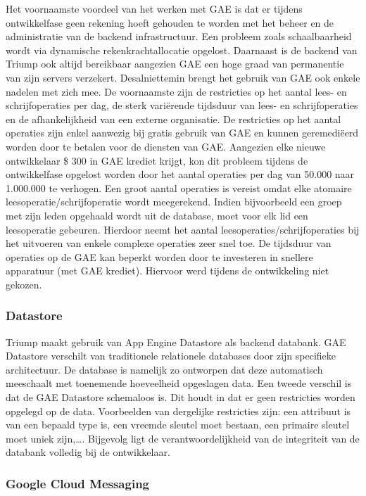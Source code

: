 Het voornaamste voordeel van het werken met GAE is dat er tijdens ontwikkelfase geen rekening hoeft gehouden te worden met het  beheer en de administratie van de backend infrastructuur. Een probleem zoals schaalbaarheid wordt via dynamische rekenkrachtallocatie opgelost. Daarnaast is de backend van Triump ook altijd bereikbaar aangezien GAE een hoge graad van permanentie van zijn servers verzekert. Desalniettemin brengt het gebruik van GAE ook enkele nadelen met zich mee. De voornaamste zijn de restricties op het aantal lees- en schrijfoperaties per dag, de sterk variërende tijdsduur van lees- en schrijfoperaties en de afhankelijkheid van een externe organisatie. De restricties op het aantal operaties zijn enkel aanwezig bij gratis gebruik van GAE en kunnen geremediëerd worden door te betalen voor de diensten van GAE.
Aangezien elke nieuwe ontwikkelaar \$ 300 in GAE krediet krijgt, kon dit probleem tijdens de ontwikkelfase opgelost worden door het aantal operaties per dag van 50.000 naar 1.000.000 te verhogen. Een groot aantal operaties is vereist omdat elke atomaire  leesoperatie/schrijfoperatie wordt meegerekend. Indien bijvoorbeeld een groep met zijn leden opgehaald wordt uit de database, moet voor elk lid een leesoperatie gebeuren. Hierdoor neemt het aantal leesoperaties/schrijfoperaties bij het uitvoeren van enkele complexe operaties zeer snel toe. De tijdsduur van operaties op de GAE kan beperkt worden door te investeren in snellere apparatuur (met GAE krediet). Hiervoor werd tijdens de ontwikkeling niet gekozen.

\subsubsection{Datastore~\cite{Google_Datastore}}

Triump maakt gebruik van App Engine Datastore als backend databank. GAE Datastore verschilt van traditionele relationele databases door zijn specifieke architectuur. De database is namelijk zo ontworpen dat deze automatisch meeschaalt met toenemende hoeveelheid opgeslagen data. Een tweede verschil is dat de GAE Datastore schemaloos is. Dit houdt in dat er geen restricties worden opgelegd op de data. Voorbeelden van dergelijke restricties zijn: een attribuut is van een bepaald type is, een vreemde sleutel moet bestaan, een primaire sleutel moet uniek zijn,\ldots. Bijgevolg ligt de verantwoordelijkheid van de integriteit van de databank volledig bij de ontwikkelaar.

\subsubsection{Google Cloud Messaging~\cite{Google_Cloud_Messaging}}

